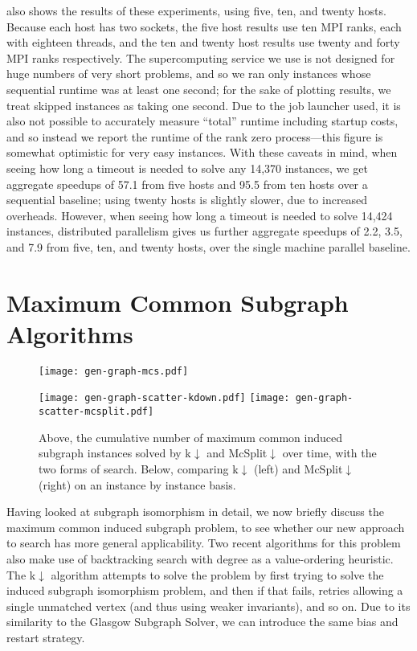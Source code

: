 \documentclass[runningheads]{llncs}
\begin{document}
 also shows the results of these experiments, using five, ten, and twenty
hosts.  Because each host has two sockets, the five host results use ten MPI ranks, each with
eighteen threads, and the ten and twenty host results use twenty and forty MPI ranks respectively.
The supercomputing service we use is not designed for huge numbers of very short problems, and so we
ran only instances whose sequential runtime was at least one second; for the sake of plotting
results, we treat skipped instances as taking one second. Due to the job launcher used, it is also
not possible to accurately measure ``total'' runtime including startup costs, and so instead we
report the runtime of the rank zero process---this figure is somewhat optimistic for very easy
instances. With these caveats in mind, when seeing how long a timeout is needed to solve any 14,370
instances, we get aggregate speedups of 57.1 from five hosts and 95.5 from ten hosts over a
sequential baseline; using twenty hosts is slightly slower, due to increased overheads. However,
when seeing how long a timeout is needed to solve 14,424 instances, distributed parallelism gives us
further aggregate speedups of 2.2, 3.5, and 7.9 from five, ten, and twenty hosts, over the single
machine parallel baseline.

\section{Maximum Common Subgraph Algorithms}

\begin{figure}[tb]
    \texttt{[image: gen-graph-mcs.pdf]}

    \medskip

    \texttt{[image: gen-graph-scatter-kdown.pdf]}
    \hfill
    \texttt{[image: gen-graph-scatter-mcsplit.pdf]}

    \caption{Above, the cumulative number of maximum common induced subgraph instances solved by
    k${\downarrow}$ and McSplit${\downarrow}$ over time, with the two forms of search. Below,
    comparing k${\downarrow}$ (left) and McSplit${\downarrow}$ (right) on an instance by instance
    basis.}\label{figure:mcs}
\end{figure}

Having looked at subgraph isomorphism in detail, we now briefly discuss the maximum common induced
subgraph problem, to see whether our new approach to search has more general applicability.  Two
recent algorithms for this problem also make use of backtracking search with degree as a
value-ordering heuristic. The k${\downarrow}$ algorithm \cite{DBLP:conf/aaai/HoffmannMR17} attempts
to solve the problem by first trying to solve the induced subgraph isomorphism problem, and then if
that fails, retries allowing a single unmatched vertex (and thus using weaker invariants), and so
on. Due to its similarity to the Glasgow Subgraph Solver, we can introduce the same bias and restart
strategy.
\end{document}
